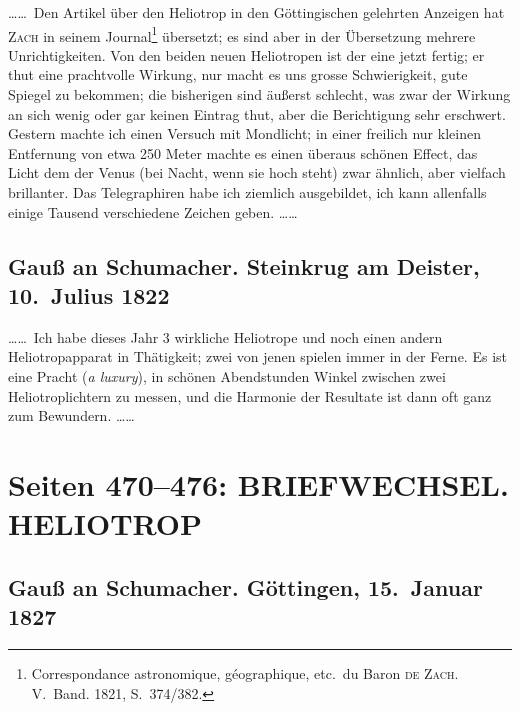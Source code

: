 \documentclass[12pt,a4paper]{article}
\theoremstyle{plain}
\theoremstyle{definition}
\theoremstyle{remark}
\begin{document}
\ldots\ldots\ Den Artikel \"uber den Heliotrop in den G\"ottingischen gelehrten Anzeigen hat \textsc{Zach} in seinem Journal\footnote{Correspondance astronomique, g\'eographique, etc.\ du Baron \textsc{de Zach}. V.\ Band. 1821, S.~374/382.} \"ubersetzt; es sind aber in der \"Ubersetzung mehrere Unrichtigkeiten. Von den beiden neuen Heliotropen ist der eine jetzt fertig; er thut eine prachtvolle Wirkung, nur macht es uns grosse Schwierigkeit, gute Spiegel zu bekommen; die bisherigen sind \"au\ss erst schlecht, was zwar der Wirkung an sich wenig oder gar keinen Eintrag thut, aber die Berichtigung sehr erschwert. Gestern machte ich einen Versuch mit Mondlicht; in einer freilich nur kleinen Entfernung von etwa 250 Meter machte es einen \"uberaus sch\"onen Effect, das Licht dem der Venus (bei Nacht, wenn sie hoch steht) zwar \"ahnlich, aber vielfach brillanter. Das Telegraphiren habe ich ziemlich ausgebildet, ich kann allenfalls einige Tausend verschiedene Zeichen geben. \ldots\ldots

\subsection*{Gau\ss{} an Schumacher. Steinkrug am Deister, 10.\ Julius 1822}

\ldots\ldots\ Ich habe dieses Jahr 3 wirkliche Heliotrope und noch einen andern Heliotropapparat in Th\"atigkeit; zwei von jenen spielen immer in der Ferne. Es ist eine Pracht (\textit{a luxury}), in sch\"onen Abendstunden Winkel zwischen zwei Heliotroplichtern zu messen, und die Harmonie der Resultate ist dann oft ganz zum Bewundern. \ldots\ldots

\vfill
\eject

\section*{Seiten 470--476: BRIEFWECHSEL. HELIOTROP}

\subsection*{Gau\ss{} an Schumacher. G\"ottingen, 15.\ Januar 1827}
\end{document}
